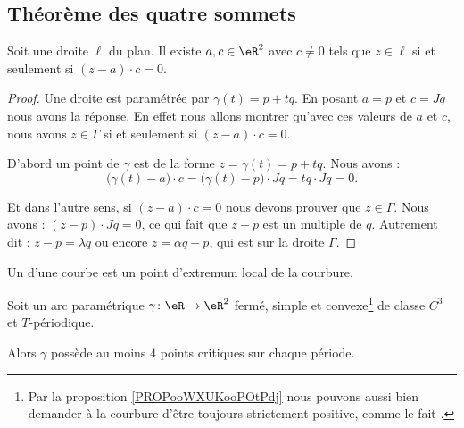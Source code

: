 \subsection{Théorème des quatre sommets}

\begin{lemma}       \label{LEMooELIRooNDVXPh}
    Soit une droite \( \ell\) du plan. Il existe \( a,c\in \eR^2\) avec \( c\neq 0\) tels que \( z\in \ell\) si et seulement si \( (z-a)\cdot c=0\).
\end{lemma}

\begin{proof}
    Une droite est paramétrée par \( \gamma(t)=p+tq\). En posant \( a=p\) et \( c=Jq\) nous avons la réponse. En effet nous allons montrer qu'avec ces valeurs de \( a\) et \( c\), nous avons \( z\in \Gamma\) si et seulement si \( (z-a)\cdot c=0\).

    D'abord un point de \( \gamma\) est de la forme \( z=\gamma(t)=p+tq\). Nous avons :
    \begin{equation}
        \big( \gamma(t)-a \big)\cdot c=\big( \gamma(t)-p \big)\cdot Jq=tq\cdot Jq=0.
    \end{equation}
    
    Et dans l'autre sens, si \( (z-a)\cdot c=0\) nous devons prouver que \( z\in \Gamma\). Nous avons : \( (z-p)\cdot Jq=0\), ce qui fait que \( z-p\) est un multiple de \( q\). Autrement dit : \( z-p=\lambda q\) ou encore \( z=\alpha q+p\), qui est sur la droite \( \Gamma\).
\end{proof}

\begin{definition}
    Un  d'une courbe est un point d'extremum local de la courbure.
\end{definition}

\begin{theorem}       \label{THOooFRBBooWKZcfY}
    Soit un arc paramétrique \( \gamma\colon \eR\to \eR^2\) fermé, simple et convexe\footnote{Par la proposition \ref{PROPooWXUKooPOtPdj} nous pouvons aussi bien demander à la courbure d'être toujours strictement positive, comme le fait \cite{KXjFWKA}.} de classe \( C^3\) et \( T\)-périodique.

    Alors \( \gamma\) possède au moins \( 4\) points critiques sur chaque période.
\end{theorem}

